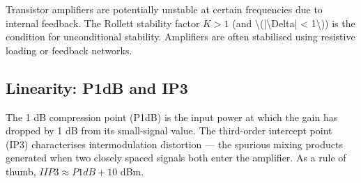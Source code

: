 				

Transistor amplifiers are potentially unstable at certain frequencies due to internal feedback. The Rollett stability factor $K > 1$ (and \textbackslash{}(|\textbackslash{}Delta| \textless{} 1\textbackslash{})) is the condition for unconditional stability. Amplifiers are often stabilised using resistive loading or feedback networks.

				

\subsection{Linearity: P1dB and IP3}

				

The 1 dB compression point (P1dB) is the input power at which the gain has dropped by 1 dB from its small-signal value. The third-order intercept point (IP3) characterises intermodulation distortion — the spurious mixing products generated when two closely spaced signals both enter the amplifier. As a rule of thumb, $IIP3 \approx P1dB + 10$ dBm.



